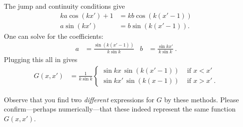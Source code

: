 \begin{example}
The jump and continuity conditions give
\begin{align}
	ka \cos(kx') + 1 &= kb \cos \left(k(x'-1)\right)
	\\
	a\sin(kx') &= b\sin \left(k(x'-1)\right) .
\end{align}
One can solve for the coefficients:
\begin{align}
	a&= \frac{\sin \left(k(x'-1)\right)}{k\sin k}
	&
	b&= \frac{\sin kx'}{k\sin k} \ .
\end{align}
Plugging this all in gives 
\begin{align}
	G(x,x') &=
	\frac{1}{k\sin k}
	\begin{cases}
	\sin kx \, \sin \left(k(x'-1)\right) &\text{ if }x < x'
	\\
	\sin kx' \, \sin \left(k(x-1)\right) &\text{ if }x > x' \ .
	\end{cases}
\end{align}
\end{example}
Observe that you find two \emph{different} expressions for $G$ by these methods. Please confirm---perhaps numerically---that these indeed represent the same function $G(x,x')$. 

